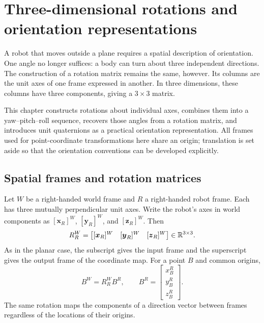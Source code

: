 \chapter{Three-dimensional rotations and orientation representations}
\label{chap:lecture04}

A robot that moves outside a plane requires a spatial description of
orientation. One angle no longer suffices: a body can turn about three
independent directions. The construction of a rotation matrix remains the
same, however. Its columns are the unit axes of one frame expressed in another.
In three dimensions, these columns have three components, giving a $3\times3$
matrix.

This chapter constructs rotations about individual axes, combines them into
a yaw--pitch--roll sequence, recovers those angles from a rotation matrix,
and introduces unit quaternions as a practical orientation representation.
All frames used for point-coordinate transformations here share an origin;
translation is set aside so that the orientation conventions can be developed
explicitly.

\section{Spatial frames and rotation matrices}
Let $W$ be a right-handed world frame and $R$ a right-handed robot frame.
Each has three mutually perpendicular unit axes. Write the robot's axes in
world components as $[\boldsymbol{x}_R]^W$, $[\boldsymbol{y}_R]^W$, and
$[\boldsymbol{z}_R]^W$. Then
\begin{equation}
 R_R^W=\begin{bmatrix}
 [\boldsymbol{x}_R]^W &[\boldsymbol{y}_R]^W &[\boldsymbol{z}_R]^W
 \end{bmatrix}\in\mathbb{R}^{3\times3}.
 \label{eq:l04-columns}
\end{equation}
As in the planar case, the subscript gives the input frame and the superscript
gives the output frame of the coordinate map. For a point $B$ and common origins,
\begin{equation}
 B^W=R_R^W B^R,\qquad
 B^R=\begin{bmatrix}x_B^R\\y_B^R\\z_B^R\end{bmatrix}.
\end{equation}
The same rotation maps the components of a direction vector between frames
regardless of the locations of their origins.

